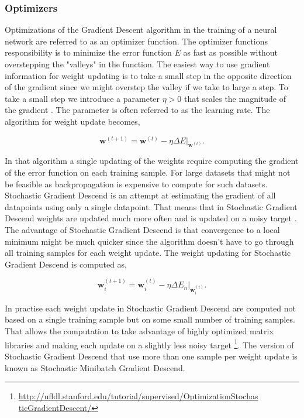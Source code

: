 \subsubsection{Optimizers}\label{sec:optimizers}

Optimizations of the Gradient Descent algorithm in the training of a neural
network are referred to as an optimizer function. The optimizer functions
responsibility is to minimize the error function $E$ as fast as possible
without overstepping the "valleys" in the function. The easiest way to use
gradient information for weight updating is to take a small step in the opposite
direction of the gradient since we might overstep the valley if we take to large
a step. To take a small step we introduce a parameter $\eta > 0$ that scales the
magnitude of the gradient \cite{Bishop}. The parameter is often referred to as
the learning rate. The algorithm for weight update becomes,

\begin{equation}
    \mathbf{w}^{(t+1)} =
        \mathbf{\mathbf{w}}^{(t)} -
        \eta\Delta E|_{\mathbf{w}^{(t)}}.
\end{equation}

In that algorithm a single updating of the weights require computing the
gradient of the error function on each training sample. For large datasets
that might not be feasible as backpropagation is expensive to compute for such
datasets. Stochastic Gradient Descend is an attempt at estimating the gradient
of all datapoints using only a single datapoint. That means that in Stochastic
Gradient Descend weights are updated much more often and is updated on a noisy
target \cite{Bishop}. The advantage of Stochastic Gradient Descend is that
convergence to a local minimum might be much quicker since the algorithm doesn't
have to go through all training samples for each weight update. The weight
updating for Stochastic Gradient Descend is computed as,

\begin{equation}
    \mathbf{w}^{(t+1)}_i =
        \mathbf{\mathbf{w}}^{(t)}_i -
        \eta\Delta E_n|_{\mathbf{w}^{(t)}_i}.
\end{equation}

In practise each weight update in Stochastic Gradient Descend are computed
not based on a single training sample but on some small number of training
samples. That allows the computation to take advantage of highly optimized
matrix libraries and making each update on a slightly less noisy target
\footnote{\url{http://ufldl.stanford.edu/tutorial/supervised/OptimizationStochas
ticGradientDescent/}}. The version of Stochastic Gradient Descend that use more
than one sample per weight update is known as Stochastic Minibatch Gradient
Descend.

